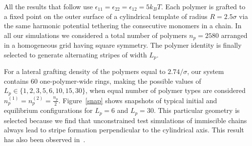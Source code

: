 All the results that follow use $\epsilon_{11} = \epsilon_{22} = \epsilon_{12} = 5 k_BT$.
Each polymer is grafted to a fixed point on the outer surface of a cylindrical template of  radius $R=2.5\sigma$ via the same harmonic potential tethering the consecutive monomers in a chain. In all our simulations we considered a total number of polymers $n_p=2580$ arranged in a homogeneous grid having square symmetry. The polymer identity is finally selected to generate alternating stripes of  width $L_p$.

For a lateral grafting density of the polymers equal to $2.74/\sigma$, our system contains $60$ one-polymer-wide rings, making the possible values of $L_p\in \{1, 2, 3, 5, 6, 10, 15, 30\}$, when equal number of polymer types are considered $n_p^{(1)}=n_p^{(2)}=\frac{n_p}{2}$. Figure~\ref{snap} shows snapshots of typical initial and equilibrium configurations 
for $L_p=6$ and $L_p=30$. 
This particular geometry is selected because we find that unconstrained test 
simulations of immiscible chains always lead to stripe formation perpendicular to the cylindrical axis.
This result has also been observed  
in~\cite{Stellacci6}.
 
